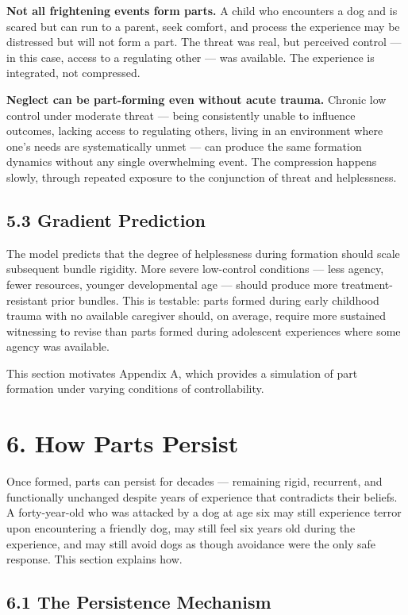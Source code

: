 \documentclass[11pt]{article}
\begin{document}
\textbf{Not all frightening events form parts.} A child who encounters a
dog and is scared but can run to a parent, seek comfort, and process the
experience may be distressed but will not form a part. The threat was
real, but perceived control --- in this case, access to a regulating
other --- was available. The experience is integrated, not compressed.

\textbf{Neglect can be part-forming even without acute trauma.} Chronic
low control under moderate threat --- being consistently unable to
influence outcomes, lacking access to regulating others, living in an
environment where one's needs are systematically unmet --- can produce
the same formation dynamics without any single overwhelming event. The
compression happens slowly, through repeated exposure to the conjunction
of threat and helplessness.

\subsection{5.3 Gradient Prediction}\label{gradient-prediction}

The model predicts that the degree of helplessness during formation
should scale subsequent bundle rigidity. More severe low-control
conditions --- less agency, fewer resources, younger developmental age
--- should produce more treatment-resistant prior bundles. This is
testable: parts formed during early childhood trauma with no available
caregiver should, on average, require more sustained witnessing to
revise than parts formed during adolescent experiences where some agency
was available.

This section motivates Appendix A, which provides a simulation of part
formation under varying conditions of controllability.

\section{6. How Parts Persist}\label{how-parts-persist}

Once formed, parts can persist for decades --- remaining rigid,
recurrent, and functionally unchanged despite years of experience that
contradicts their beliefs. A forty-year-old who was attacked by a dog at
age six may still experience terror upon encountering a friendly dog,
may still feel six years old during the experience, and may still avoid
dogs as though avoidance were the only safe response. This section
explains how.

\subsection{6.1 The Persistence
Mechanism}\label{the-persistence-mechanism}
\end{document}
